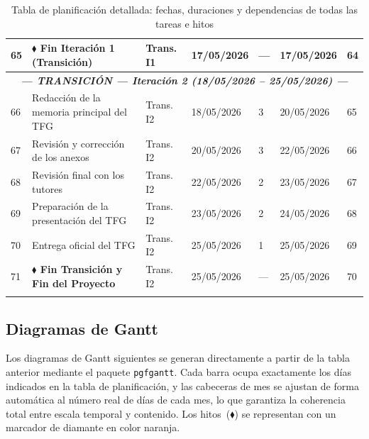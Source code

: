 \documentclass[11pt, a4paper]{article}
\begin{document}
\begin{longtable}{|p{0.6cm}|p{5.2cm}|p{2.5cm}|p{1.9cm}|p{0.9cm}|p{1.9cm}|p{1.4cm}|}
\hline
65 & \textbf{$\blacklozenge$ Fin Iteración 1 (Transición)} & Trans. I1 & 17/05/2026 & --- & 17/05/2026 & 64 \\
\hline
\multicolumn{7}{|c|}{\textit{\textbf{--- TRANSICIÓN --- Iteración 2 (18/05/2026 -- 25/05/2026) ---}}} \\
\hline
66 & Redacción de la memoria principal del TFG & Trans. I2 & 18/05/2026 & 3 & 20/05/2026 & 65 \\
\hline
67 & Revisión y corrección de los anexos & Trans. I2 & 20/05/2026 & 3 & 22/05/2026 & 66 \\
\hline
68 & Revisión final con los tutores & Trans. I2 & 22/05/2026 & 2 & 23/05/2026 & 67 \\
\hline
69 & Preparación de la presentación del TFG & Trans. I2 & 23/05/2026 & 2 & 24/05/2026 & 68 \\
\hline
70 & Entrega oficial del TFG & Trans. I2 & 25/05/2026 & 1 & 25/05/2026 & 69 \\
\hline
71 & \textbf{$\blacklozenge$ Fin Transición y Fin del Proyecto} & Trans. I2 & 25/05/2026 & --- & 25/05/2026 & 70 \\
\hline
\caption{Tabla de planificación detallada: fechas, duraciones y dependencias de todas las tareas e hitos}\label{tab:planificacion-detalle}
\end{longtable}

\subsection{Diagramas de Gantt}

Los diagramas de Gantt siguientes se generan directamente a partir de la tabla anterior mediante el paquete \texttt{pgfgantt}. Cada barra ocupa exactamente los días indicados en la tabla de planificación, y las cabeceras de mes se ajustan de forma automática al número real de días de cada mes, lo que garantiza la coherencia total entre escala temporal y contenido. Los hitos~($\blacklozenge$) se representan con un marcador de diamante en color naranja.

\end{document}
